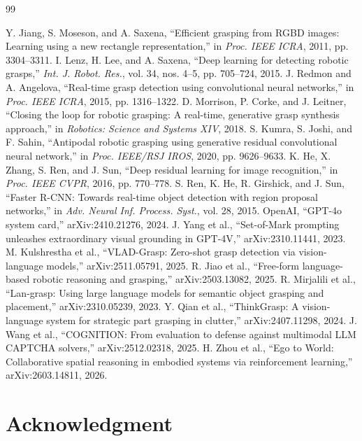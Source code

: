 \documentclass[12pt,letterpaper]{article}
\begin{document}
\newpage
\begin{thebibliography}{99}
 Y. Jiang, S. Moseson, and A. Saxena, ``Efficient grasping from RGBD images: Learning using a new rectangle representation,'' in \emph{Proc. IEEE ICRA}, 2011, pp. 3304--3311.
 I. Lenz, H. Lee, and A. Saxena, ``Deep learning for detecting robotic grasps,'' \emph{Int. J. Robot. Res.}, vol. 34, nos. 4--5, pp. 705--724, 2015.
 J. Redmon and A. Angelova, ``Real-time grasp detection using convolutional neural networks,'' in \emph{Proc. IEEE ICRA}, 2015, pp. 1316--1322.
 D. Morrison, P. Corke, and J. Leitner, ``Closing the loop for robotic grasping: A real-time, generative grasp synthesis approach,'' in \emph{Robotics: Science and Systems XIV}, 2018.
 S. Kumra, S. Joshi, and F. Sahin, ``Antipodal robotic grasping using generative residual convolutional neural network,'' in \emph{Proc. IEEE/RSJ IROS}, 2020, pp. 9626--9633.
 K. He, X. Zhang, S. Ren, and J. Sun, ``Deep residual learning for image recognition,'' in \emph{Proc. IEEE CVPR}, 2016, pp. 770--778.
 S. Ren, K. He, R. Girshick, and J. Sun, ``Faster R-CNN: Towards real-time object detection with region proposal networks,'' in \emph{Adv. Neural Inf. Process. Syst.}, vol. 28, 2015.
 OpenAI, ``GPT-4o system card,'' arXiv:2410.21276, 2024.
 J. Yang et al., ``Set-of-Mark prompting unleashes extraordinary visual grounding in GPT-4V,'' arXiv:2310.11441, 2023.
 M. Kulshrestha et al., ``VLAD-Grasp: Zero-shot grasp detection via vision-language models,'' arXiv:2511.05791, 2025.
 R. Jiao et al., ``Free-form language-based robotic reasoning and grasping,'' arXiv:2503.13082, 2025.
 R. Mirjalili et al., ``Lan-grasp: Using large language models for semantic object grasping and placement,'' arXiv:2310.05239, 2023.
 Y. Qian et al., ``ThinkGrasp: A vision-language system for strategic part grasping in clutter,'' arXiv:2407.11298, 2024.
 J. Wang et al., ``COGNITION: From evaluation to defense against multimodal LLM CAPTCHA solvers,'' arXiv:2512.02318, 2025.
 H. Zhou et al., ``Ego to World: Collaborative spatial reasoning in embodied systems via reinforcement learning,'' arXiv:2603.14811, 2026.
\end{thebibliography}

\section*{Acknowledgment}
\end{document}
